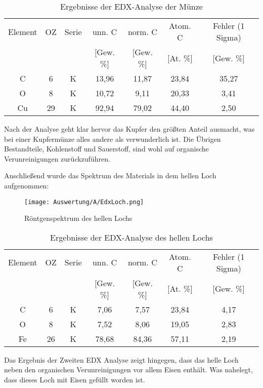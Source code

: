 \begin{table}[h]
    \centering
    \begin{tabular}{c|c|c|c|c|c|c}
        Element & OZ &Serie& unn. C & norm. C &  Atom. C  & Fehler (1 Sigma) \\
         & & & [Gew. \%] & [Gew. \%] & [At. \%] & [Gew. \%] \\
        \hline\hline
        C & 6 & K & 13,96&11,87&23,84 & 35,27\\
        O & 8 & K & 10,72&9,11&20,33 & 3,41\\
        Cu & 29 & K & 92,94&79,02&44,40 & 2,50\\
    \end{tabular}
    \caption{Ergebnisse der EDX-Analyse der Münze}
\end{table}

Nach der Analyse geht klar hervor das Kupfer den größten Anteil ausmacht, was bei einer Kupfermünze alles andere als verwunderlich ist. Die Übrigen Bestandteile, Kohlenstoff und Sauerstoff, sind wohl auf organische Verunreinigungen zurückzuführen.

\newpage
Anschließend wurde das Spektrum des Materials in dem hellen Loch aufgenommen: 
\begin{figure}[h]
    \centering
    \texttt{[image: Auswertung/A/EdxLoch.png]}
    \caption{Röntgenspektrum des hellen Lochs}
\end{figure}


\begin{table}[h]
    \centering
    \begin{tabular}{c|c|c|c|c|c|c}
        Element & OZ &Serie& unn. C & norm. C &  Atom. C  & Fehler (1 Sigma) \\
         & & & [Gew. \%] & [Gew. \%] & [At. \%] & [Gew. \%] \\
        \hline\hline
        C & 6 & K & 7,06&7,57&23,84 & 4,17\\
        O & 8 & K & 7,52&8,06&19,05 & 2,83\\
        Fe & 26 & K & 78,68&84,36&57,11 & 2,19\\
    \end{tabular}
    \caption{Ergebnisse der EDX-Analyse des hellen Lochs}
\end{table}

Das Ergebnis der Zweiten EDX Analyse zeigt hingegen, dass das helle Loch neben den organischen Verunreinigungen vor allem Eisen enthält. Was nahelegt, dass dieses Loch mit Eisen gefüllt worden ist.

